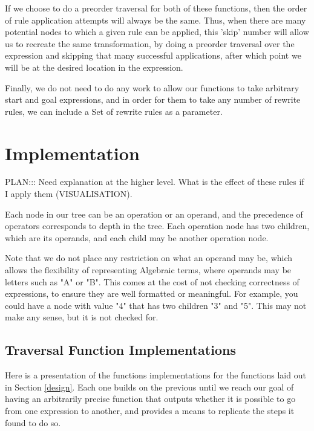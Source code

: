 \documentclass{l4proj}
\begin{document}
If we choose to do a preorder traversal for both of these functions, then the order of rule application attempts will always be the same. Thus, when there are many potential nodes to which a given rule can be applied, this 'skip' number will allow us to recreate the same transformation, by doing a preorder traversal over the expression and skipping that many successful applications, after which point we will be at the desired location in the expression.


Finally, we do not need to do any work to allow our functions to take arbitrary start and goal expressions, and in order for them to take any number of rewrite rules, we can include a Set of rewrite rules as a parameter.


\chapter{Implementation} \label{implementation}


PLAN:::
Need explanation at the higher level. What is the effect of these rules if I apply them (VISUALISATION).



Each node in our tree can be an operation or an operand, and the precedence of operators corresponds to depth in the tree. Each operation node has two children, which are its operands, and each child may be another operation node. 

Note that we do not place any restriction on what an operand may be, which allows the flexibility of representing Algebraic terms, where operands may be letters such as "A" or "B". This comes at the cost of not checking correctness of expressions, to ensure they are well formatted or meaningful. For example, you could have a node with value "4" that has two children "3" and "5". This may not make any sense, but it is not checked for.






\section{Traversal Function Implementations}

Here is a presentation of the functions implementations for the functions laid out in Section \ref{design}. Each one builds on the previous until we reach our goal of having an arbitrarily precise function that outputs whether it is possible to go from one expression to another, and provides a means to replicate the steps it found to do so.
\end{document}
